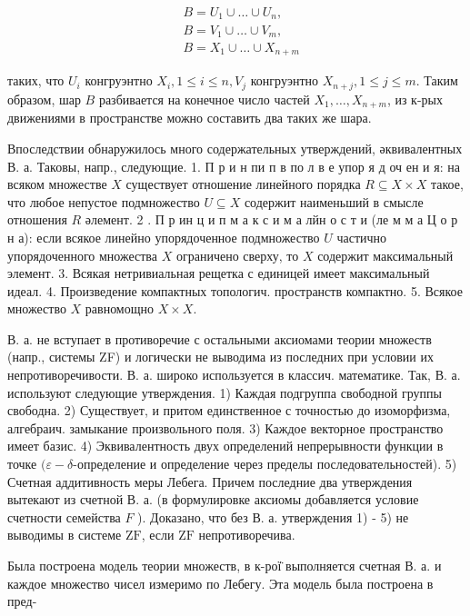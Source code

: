 \documentclass[10pt]{article}
\begin{document}
\[

\begin{aligned}

& B=U_{1} \cup \ldots \cup U_{n}, \\

& B=V_{1} \cup \ldots \cup V_{m}, \\

& B=X_{1} \cup \ldots \cup X_{n+m}

\end{aligned}

\]



таких, что $U_{i}$ конгруэнтно $X_{i}, 1 \leqslant i \leqslant n, V_{j}$ конгруэнтно $X_{n+j}, 1 \leqslant j \leqslant m$. Таким образом, шар $B$ разбивается на конечное число частей $X_{1}, \ldots, X_{n+m}$, из к-рых движениями в пространстве можно составить два таких же шара.



Впоследствии обнаружилось много содержательных утверждений, әквивалентных В. а. Таковы, напр., следующие. 1. П р и н пи п в по л в е упор я д оч ен и я: на всяком множестве $X$ существует отношение линейного порядка $R \subseteq X \times X$ такое, что любое непустое подмножество $U \subseteq X$ содержит наименьший в смысле отношения $R$ әлемент. 2 . П р ин ц и п м а к с и м а лйн о с т и (ле м м а Ц о р н а): если всякое линейно упорядоченное подмножество $U$ частично упорядоченного множества $X$ ограничено сверху, то $X$ содержит максимальный элемент. 3. Всякая нетривиальная рещетка с единицей имеет максимальный идеал. 4. Произведение компактных топологич. пространств компактно. 5. Всякое множество $X$ равномощно $X \times X$.



В. а. не вступает в противоречие с остальными аксиомами теории множеств (напр., системы ZF) и логически не выводима из последних при условии их непротиворечивости. В. а. широко используется в классич. математике. Так, В. а. используют следующие утверждения. 1) Каждая подгруппа свободной группы свободна. 2) Существует, и притом единственное с точностью до изоморфизма, алгебраич. замыкание произвольного поля. 3) Каждое векторное пространство имеет базис. 4) Эквивалентность двух определений непрерывности функции в точке $(\varepsilon-\delta$-определение и определение через пределы последовательностей). 5) Счетная аддитивность меры Лебега. Причем последние два утверждения вытекают из счетной В. а. (в формулировке аксиомы добавляется условие счетности семейства $F$ ). Доказано, что без В. а. утверждения 1) - 5) не выводимы в системе $\mathrm{ZF}$, если $\mathrm{ZF}$ непротиворечива.



Была построена модель теории множеств, в к-рої̈ выполняется счетная В. а. и каждое множество чисел измеримо по Лебегу. Эта модель была построена в пред-
\end{document}
